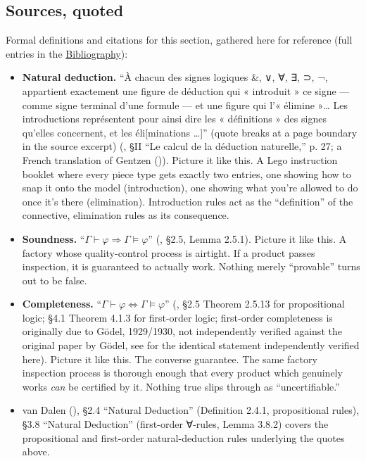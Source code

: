 \subsection{Sources, quoted}\label{sec:03-propositions-and-proofs:02-logic-recap:8}

Formal definitions and citations for this section, gathered here for reference (full entries in the \hyperref[sec:root:bibliography:1]{Bibliography}):

\begin{itemize}
\tightlist
\item
  \textbf{Natural deduction.} ``À chacun des signes logiques \&, ∨, ∀, ∃, ⊃, ¬, appartient exactement une figure de déduction qui « introduit » ce signe --- comme signe terminal d'une formule --- et une figure qui l'« élimine »\ldots{} Les introductions représentent pour ainsi dire les « définitions » des signes qu'elles concernent, et les éli{[}minations \ldots{]}'' (quote breaks at a page boundary in the source excerpt) (\cite{FeysLadriere1955}, §II ``Le calcul de la déduction naturelle,'' p. 27; a French translation of Gentzen (\cite{Gentzen1935})). Picture it like this. A Lego instruction booklet where every piece type gets exactly two entries, one showing how to snap it onto the model (introduction), one showing what you're allowed to do once it's there (elimination). Introduction rules act as the ``definition'' of the connective, elimination rules as its consequence.
\item
  \textbf{Soundness.} ``\(\Gamma \vdash \varphi \Rightarrow \Gamma \models \varphi\)'' (\cite{VanDalen2013}, §2.5, Lemma 2.5.1). Picture it like this. A factory whose quality-control process is airtight. If a product passes inspection, it is guaranteed to actually work. Nothing merely ``provable'' turns out to be false.
\item
  \textbf{Completeness.} ``\(\Gamma \vdash \varphi \Leftrightarrow \Gamma \models \varphi\)'' (\cite{VanDalen2013}, §2.5 Theorem 2.5.13 for propositional logic; §4.1 Theorem 4.1.3 for first-order logic; first-order completeness is originally due to Gödel, 1929/1930, not independently verified against the original paper by Gödel, see \cite{VanDalen2013} for the identical statement independently verified here). Picture it like this. The converse guarantee. The same factory inspection process is thorough enough that every product which genuinely works \emph{can} be certified by it. Nothing true slips through as ``uncertifiable.''
\item
  van Dalen (\cite{VanDalen2013}), §2.4 ``Natural Deduction'' (Definition 2.4.1, propositional rules), §3.8 ``Natural Deduction'' (first-order ∀-rules, Lemma 3.8.2) covers the propositional and first-order natural-deduction rules underlying the quotes above.

\end{itemize}
